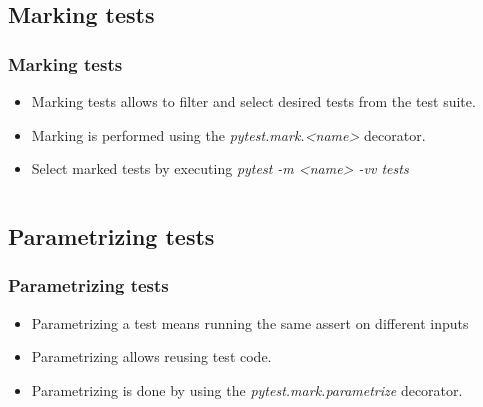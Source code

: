 \documentclass[t]{beamer}
\begin{document}
\subsection{Marking tests}
\begin{frame}[fragile=singleslide]
  \frametitle{Marking tests}

   \begin{itemize}
       \item Marking tests allows to filter and select desired tests from the test suite.
       \item Marking is performed using the \textit{pytest.mark.<name>} decorator.
       \item Select marked tests by executing \textit{pytest -m <name> -vv tests}
   \end{itemize}

   \inputminted[fontsize=\footnotesize]{python}{code/marked_test.py}

\end{frame}

\subsection{Parametrizing tests}
\begin{frame}[fragile=singleslide]
  \frametitle{Parametrizing tests}

   \begin{itemize}
           \item Parametrizing a test means running the same assert on different inputs
           \item Parametrizing allows reusing test code.
           \item Parametrizing is done by using the \textit{pytest.mark.parametrize} decorator.
   \end{itemize}

   \inputminted[fontsize=\footnotesize]{python}{code/parametrized_test.py}

\end{frame}

\end{document}
